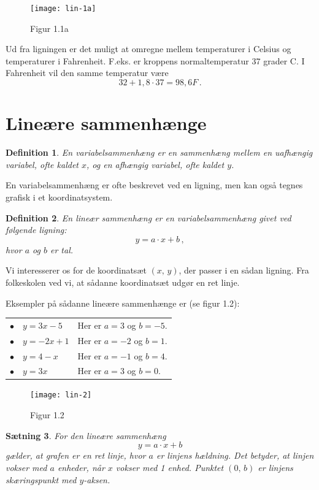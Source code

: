 \documentclass[12pt,oneside,a4paper]{article}
\newtheorem{thm}{Sætning}[section]
\newtheorem{mydef}[thm]{Definition}
\begin{document}
\begin{figure}[H]
    \centering
    \texttt{[image: lin-1a]}
    \caption{Figur 1.1a}
\end{figure}

Ud fra ligningen er det muligt at omregne mellem temperaturer i Celsius og
temperaturer i Fahrenheit. F.eks.  er kroppens normaltemperatur 37 grader C. I
Fahrenheit vil den samme temperatur være
\[
    32 + 1,8\cdot 37 = 98,6 F \,.
\]



\section{Lineære sammenhænge}
\begin{mydef}
    En variabelsammenhæng er en sammenhæng mellem en uafhængig variabel, ofte
    kaldet $x$, og en afhængig variabel, ofte kaldet $y$.
\end{mydef}

En variabelsammenhæng er ofte beskrevet ved en ligning, men kan også tegnes grafisk i et
koordinatsystem.

\begin{mydef}
    En lineær sammenhæng er en variabelsammenhæng givet ved følgende ligning:
    $$
    y = a\cdot x + b \,,
    $$
    hvor $a$ og $b$ er tal.
\end{mydef}

Vi interesserer os for de koordinatsæt $(x,\,y)$, der passer i en sådan ligning.
Fra folkeskolen ved vi, at sådanne koordinatsæt udgør en ret linje.

Eksempler på sådanne lineære sammenhænge er (se figur 1.2):

\begin{tabular}{ll}
    $\bullet\quad y=3x-5$  & Her er $a=3$ og $b=-5$. \\
    $\bullet\quad y=-2x+1$ & Her er $a=-2$ og $b=1$. \\
    $\bullet\quad y=4-x$   & Her er $a=-1$ og $b=4$. \\
    $\bullet\quad y=3x$    & Her er $a=3$ og $b=0$.
\end{tabular}

\begin{figure}[H]
    \centering
    \texttt{[image: lin-2]}
    \caption{Figur 1.2}
\end{figure}

\begin{thm}
    For den lineære sammenhæng
    $$
    y = a\cdot x + b
    $$
    gælder, at grafen er en ret linje, hvor $a$ er linjens {\em hældning}.  Det
    betyder, at linjen vokser med $a$ enheder, når $x$ vokser med 1 enhed.
    Punktet $(0,\,b)$ er linjens {\em skæringspunkt med $y$-aksen}.
\end{thm}
\end{document}
